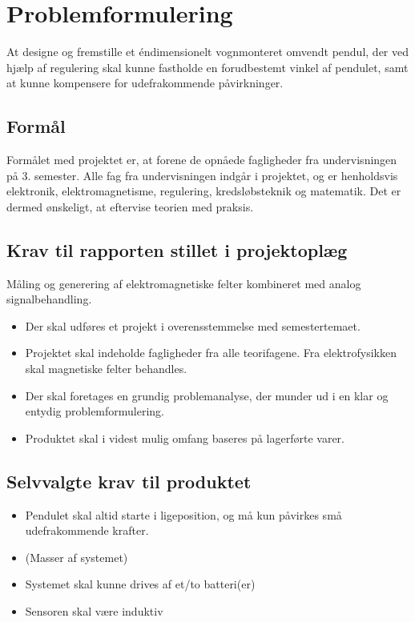 
\section{Problemformulering}
At designe og fremstille et éndimensionelt vognmonteret omvendt pendul, der ved hjælp af regulering skal kunne fastholde en forudbestemt vinkel af pendulet, samt at kunne kompensere for udefrakommende påvirkninger. 

\subsection{Formål}
Formålet med projektet er, at forene de opnåede fagligheder fra undervisningen på 3. semester. 
Alle fag fra undervisningen indgår i projektet, og er henholdsvis elektronik, elektromagnetisme, regulering, kredsløbsteknik og matematik.
Det er dermed ønskeligt, at eftervise teorien med praksis. 


\subsection{Krav til rapporten stillet i projektoplæg}
Måling og generering af elektromagnetiske felter kombineret med analog signalbehandling.
\begin{itemize}
\item Der skal udføres et projekt i overensstemmelse med semestertemaet.
\item Projektet skal indeholde fagligheder fra alle teorifagene. Fra elektrofysikken skal
magnetiske felter behandles.
\item Der skal foretages en grundig problemanalyse, der munder ud i en klar og entydig
problemformulering.
\item Produktet skal i videst mulig omfang baseres på lagerførte varer.
\end{itemize}

\subsection{Selvvalgte krav til produktet} \label{afs:kravspecifikation}
\begin{itemize}
\item Pendulet skal altid starte i ligeposition, og må kun påvirkes små udefrakommende krafter.
\item (Masser af systemet)
\item Systemet skal kunne drives af et/to batteri(er)
\item Sensoren skal være induktiv
\end{itemize}

